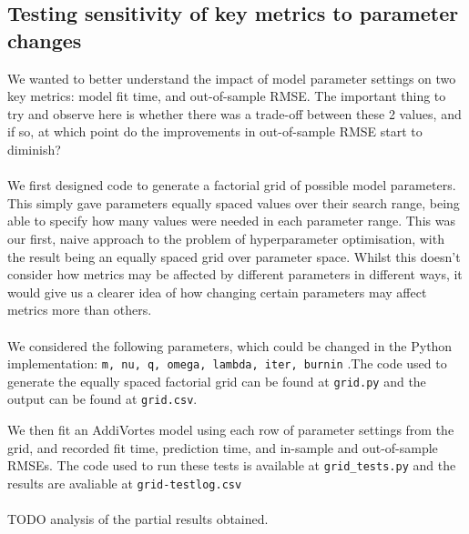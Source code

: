 \documentclass[11pt,twoside,a4paper]{article}
\begin{document}
\subsection{Testing sensitivity of key metrics to parameter changes}
We wanted to better understand the impact of model parameter settings on two key metrics: model fit time, and out-of-sample RMSE. The important thing to try and observe here is whether there was a trade-off between these 2 values, and if so, at  which point do the improvements in out-of-sample RMSE start to diminish?\\\\
We first designed code to generate a factorial grid of possible model parameters. This simply gave parameters equally spaced values over their search range, being able to specify how many values were needed in each parameter range. This was our first, naive approach to the problem of hyperparameter optimisation, with the result being an equally spaced grid over parameter space. Whilst this doesn't consider how metrics may be affected by different parameters in different ways, it would give us a clearer idea of how changing certain parameters may affect metrics more than others.\\
\\
We considered the following parameters, which could be changed in the Python implementation: \texttt{m, nu, q, omega, lambda, iter, burnin} .The code used to generate the equally spaced factorial grid can be found at \nolinkurl{grid.py} and the output can be found at \nolinkurl{grid.csv}\cite{repo}.
\\
\begin{table}[h]
\begin{center}
\caption{The first 10 rows of the factorial grid with 2 options for each parameter}
\end{center}
\end{table}
We then fit an AddiVortes model using each row of parameter settings from the grid, and recorded fit time, prediction time, and in-sample and out-of-sample RMSEs. The code used to run these tests is available at \nolinkurl{grid_tests.py} and the results are avaliable at \nolinkurl{grid-testlog.csv}
\\\\
TODO analysis of the partial results obtained. 
\end{document}
